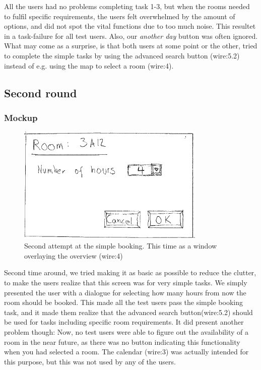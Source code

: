 All the users had no problems completing task 1-3, but when the rooms needed to fulfil specific requirements, the  users felt overwhelmed by the amount of options, and did not spot the vital functions due to too much noise. This resultet in a task-failure for all test users. Also, our \emph{another day} button was often ignored. \\

What may come as a surprise, is that both users at some point or the other, tried to complete the simple tasks by using the advanced search button (wire:5.2) instead of e.g. using the map to select a room (wire:4). \\
\pagebreak


\subsection{Second round}
\subsubsection{Mockup}
\begin{figure}[htb]
\begin{center}
\leavevmode
\includegraphics[width=0.8\textwidth]{images/bookRoomMockup2}
\end{center}
\caption{Second attempt at the simple booking. This time as a window overlaying the overview (wire:4)}
\label{fig:book_room_mockup2}
\end{figure}

Second time around, we tried making it as basic as possible to reduce the clutter, to make the users realize that this screen was for very simple tasks. We simply presented the user with a dialogue for selecting how many hours from now the room should be booked. This made all the test users pass the simple booking task, and it made them realize that the advanced search button(wire:5.2) should be used for tasks including specific room requirements. It did present another problem though: Now, no test users were able to figure out the availability of a room in the near future, as there was no button indicating this functionality when you had selected a room. The calendar (wire:3) was actually intended for this purpose, but this was not used by any of the users.\\

